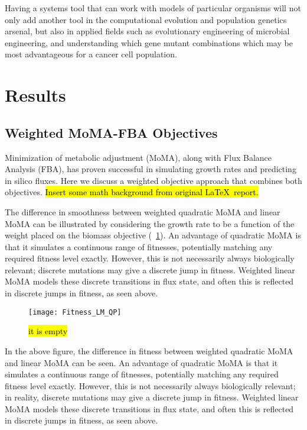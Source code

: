 Having a systems tool that can work with models of particular organisms
will not only add another tool in the computational evolution and
population genetics arsenal, but also in applied fields such as
evolutionary engineering of microbial engineering, and understanding
which gene mutant combinations which may be most advantageous for
a cancer cell population.

\section{Results}

\subsection{Weighted MoMA-FBA Objectives}

Minimization of metabolic adjustment (MoMA), along with Flux Balance
Analysis (FBA), has proven successful in simulating growth rates and
predicting in silico fluxes. Here we discuss a weighted objective
approach that combines both objectives. \hl{Insert some math background
from original \LaTeX~report.} 

The difference in smoothness between weighted quadratic MoMA and linear
MoMA can be illustrated by considering the growth rate to be a
function of the weight placed on the biomass objective (\Fig~\ref{fig:Fitness_LM_QP}).  An
advantage of quadratic MoMA is that it simulates a continuous range of
fitnesses, potentially matching any required fitness level exactly.
However, this is not necessarily always biologically relevant;
discrete mutations may give a discrete jump in fitness. Weighted
linear MoMA models these discrete transitions in flux state, and often
this is reflected in discrete jumps in fitness, as seen above.

\begin{figure}
\centering
  \texttt{[image: Fitness\_LM\_QP]}
  \caption{\hl{it is empty}}
  \label{fig:Fitness_LM_QP}
\end{figure}

In the above figure, the difference in fitness between weighted
quadratic MoMA and linear MoMA can be seen. An advantage of quadratic
MoMA is that it simulates a continuous range of fitnesses, potentially
matching any required fitness level exactly.  However, this is not
necessarily always biologically relevant; in reality, discrete mutations may give
a discrete jump in fitness. Weighted linear MoMA models these discrete
transitions in flux state, and often this is reflected in discrete
jumps in fitness, as seen above.

